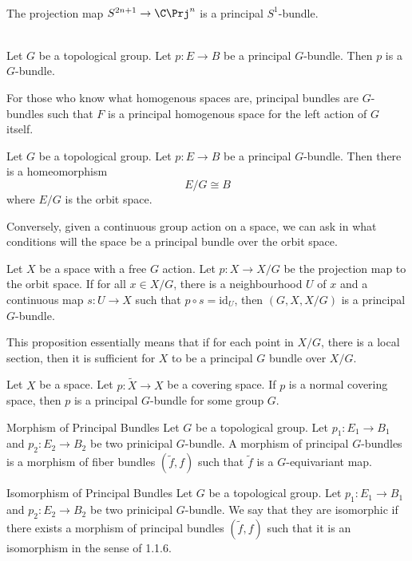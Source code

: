 \documentclass[a4paper]{article}
\begin{document}
\begin{eg}{}{}\\
The projection map $S^{2n+1}\to\C\Prj^n$ is a principal $S^1$-bundle. 
\end{eg}

\begin{lmm}{}{}\\
Let $G$ be a topological group. Let $p:E\to B$ be a principal $G$-bundle. Then $p$ is a $G$-bundle. 
\end{lmm}

For those who know what homogenous spaces are, principal bundles are $G$-bundles such that $F$ is a principal homogenous space for the left action of $G$ itself. 

\begin{prp}{}{} Let $G$ be a topological group. Let $p:E\to B$ be a principal $G$-bundle. Then there is a homeomorphism $$E/G\cong B$$ where $E/G$ is the orbit space. 
\end{prp}

Conversely, given a continuous group action on a space, we can ask in what conditions will the space be a principal bundle over the orbit space. 

\begin{prp}{}{} Let $X$ be a space with a free $G$ action. Let $p:X\to X/G$ be the projection map to the orbit space. If for all $x\in X/G$, there is a neighbourhood $U$ of $x$ and a continuous map $s:U\to X$ such that $p\circ s=\text{id}_U$, then $(G,X,X/G)$ is a principal $G$-bundle. 
\end{prp}

This proposition essentially means that if for each point in $X/G$, there is a local section, then it is sufficient for $X$ to be a principal $G$ bundle over $X/G$. 

\begin{prp}{}{} Let $X$ be a space. Let $p:\tilde{X}\to X$ be a covering space. If $p$ is a normal covering space, then $p$ is a principal $G$-bundle for some group $G$. 
\end{prp}

\begin{defn}{Morphism of Principal Bundles}{} Let $G$ be a topological group. Let $p_1:E_1\to B_1$ and $p_2:E_2\to B_2$ be two prinicipal $G$-bundle. A morphism of principal $G$-bundles is a morphism of fiber bundles $(\tilde{f},f)$ such that $\tilde{f}$ is a $G$-equivariant map. 
\end{defn}

\begin{defn}{Isomorphism of Principal Bundles}{} Let $G$ be a topological group. Let $p_1:E_1\to B_1$ and $p_2:E_2\to B_2$ be two prinicipal $G$-bundle. We say that they are isomorphic if there exists a morphism of principal bundles $(\tilde{f},f)$ such that it is an isomorphism in the sense of 1.1.6. 
\end{defn}
\end{document}
